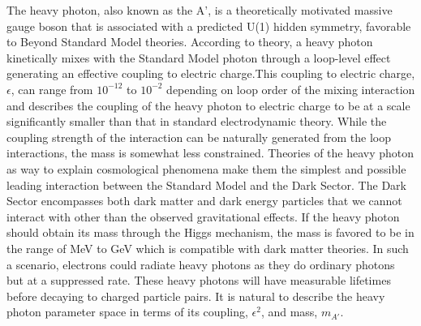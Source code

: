 \documentclass[12pt]{report}
\begin{document}
The heavy photon, also known as the A', is a theoretically motivated massive gauge boson that is associated with a predicted U(1) hidden symmetry, favorable to Beyond Standard Model theories. According to theory, a heavy photon kinetically mixes with the Standard Model photon through a loop-level effect generating an effective coupling to electric charge.This coupling to electric charge, $\epsilon$, can range from $10^{-12}$ to $10^{-2}$ depending on loop order of the mixing interaction and describes the coupling of the heavy photon to electric charge to be at a scale significantly smaller than that in standard electrodynamic theory. While the coupling strength of the interaction can be naturally generated from the loop interactions, the mass is somewhat less constrained. Theories of the heavy photon as way to explain cosmological phenomena make them the simplest and possible leading interaction between the Standard Model and the Dark Sector. The Dark Sector encompasses both dark matter and dark energy particles that we cannot interact with other than the observed gravitational effects. If the heavy photon should obtain its mass through the Higgs mechanism, the mass is favored to be in the range of MeV to GeV which is compatible with dark matter theories. In such a scenario, electrons could radiate heavy photons as they do ordinary photons but at a suppressed rate. These heavy photons will have measurable lifetimes before decaying to charged particle pairs. It is natural to describe the heavy photon parameter space in terms of its coupling, $\epsilon^2$, and mass, $m_{A'}$. \\
\end{document}
